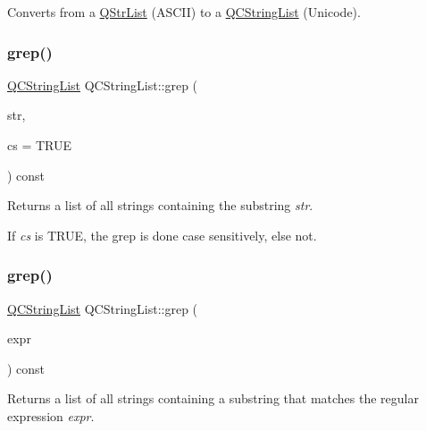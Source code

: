 Converts from a \mbox{\hyperlink{class_q_str_list}{Q\+Str\+List}} (A\+S\+C\+II) to a \mbox{\hyperlink{class_q_c_string_list}{Q\+C\+String\+List}} (Unicode). \mbox{\label{class_q_c_string_list_ae8a239f0870315d5e9b02cf6bddd2237}} 
\subsubsection{\texorpdfstring{grep()}{grep()}\hspace{0.1cm}{\footnotesize\ttfamily [1/2]}}
{\footnotesize\ttfamily \mbox{\hyperlink{class_q_c_string_list}{Q\+C\+String\+List}} Q\+C\+String\+List\+::grep (\begin{DoxyParamCaption}\item[{const \mbox{\hyperlink{class_q_c_string}{Q\+C\+String}} \&}]{str,  }\item[{bool}]{cs = {\ttfamily TRUE} }\end{DoxyParamCaption}) const}

Returns a list of all strings containing the substring {\itshape str}.

If {\itshape cs} is T\+R\+UE, the grep is done case sensitively, else not. \mbox{\label{class_q_c_string_list_aab758c04ef18aed9dad4f93226d9760c}} 
\subsubsection{\texorpdfstring{grep()}{grep()}\hspace{0.1cm}{\footnotesize\ttfamily [2/2]}}
{\footnotesize\ttfamily \mbox{\hyperlink{class_q_c_string_list}{Q\+C\+String\+List}} Q\+C\+String\+List\+::grep (\begin{DoxyParamCaption}\item[{const \mbox{\hyperlink{class_q_reg_exp}{Q\+Reg\+Exp}} \&}]{expr }\end{DoxyParamCaption}) const}

Returns a list of all strings containing a substring that matches the regular expression {\itshape expr}. \mbox{\label{class_q_c_string_list_a6f889e803df00f762cbc6ce37bd9b5c0}} 
